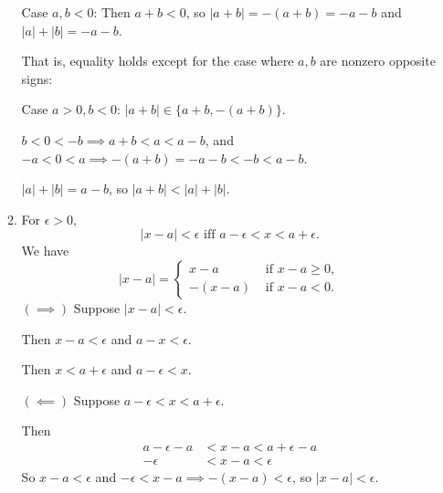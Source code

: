 \begin{enumerate}
\begin{enumerate}[label=(\roman*),align=left]
		Case $a,b<0$: Then $a+b < 0 $, so $|a+b| = -(a+b) = -a-b$ and $|a|+|b| = -a- b$.\par
		That is, equality holds except for the case where $a,b$ are nonzero opposite signs:\par
		Case $a>0,b<0$: $|a+b| \in \{a+b, -(a+b)\}$.\par
		$b<0<-b \implies a+b<a<a-b$, and $-a<0<a \implies -(a+b)=-a-b<-b<a-b$.\par
		$|a|+|b| = a- b$, so $|a+b| < |a|+|b|$.
		\item For $\epsilon >0,$
		\[ |x-a| < \epsilon \text{  iff  } a - \epsilon < x < a + \epsilon.\]
		We have
		\[ 
		|x-a| =
		\begin{cases} 
			x-a & \text{ if } x-a \ge 0, \\
			-(x-a) & \text{ if } x-a < 0.
		\end{cases}
		\]
		$(\implies)$ Suppose $|x-a| < \epsilon$.\par
		Then $x-a < \epsilon$ and $a-x < \epsilon$.\par
		Then $x< a+\epsilon$ and $a-\epsilon<x$.\par
		$(\impliedby)$ Suppose $a - \epsilon < x < a + \epsilon$.\par
		Then
		\begin{align*}
		a - \epsilon-a &< x-a < a + \epsilon-a \\
		- \epsilon &< x-a < \epsilon
		\end{align*}
		So $x-a < \epsilon$ and $- \epsilon < x-a \implies -(x-a)< \epsilon$, so $|x-a| < \epsilon$.
	\end{enumerate}
\end{enumerate}


